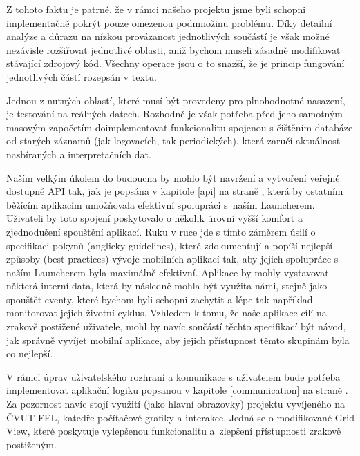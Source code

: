 \documentclass[thesis=M,czech]{FITthesis}[2012/06/26]
\begin{document}
Z tohoto faktu je patrné, že v rámci našeho projektu jsme byli schopni implementačně pokrýt pouze omezenou podmnožinu problému. Díky detailní analýze a důrazu na nízkou provázanost jednotlivých součástí je však možné nezávisle rozšiřovat jednotlivé oblasti, aniž bychom museli zásadně modifikovat stávající zdrojový kód. Všechny operace jsou o to snazší, že je princip fungování jednotlivých částí rozepsán v textu. 

Jednou z nutných oblastí, které musí být provedeny pro plnohodnotné nasazení, je testování na reálných datech. Rozhodně je však potřeba před jeho samotným masovým započetím doimplementovat funkcionalitu spojenou s čištěním databáze od starých záznamů (jak logovacích, tak periodických), která zaručí aktuálnost nasbíraných a interpretačních dat.

Naším velkým úkolem do budoucna by mohlo být navržení a vytvoření veřejně dostupné API tak, jak je popsána v kapitole \ref{api} na straně \pageref{api}, která by ostatním běžícím aplikacím umožňovala efektivní spolupráci s~naším Launcherem. Uživateli by toto spojení poskytovalo o několik úrovní vyšší komfort a zjednodušení spouštění aplikací. Ruku v ruce jde s tímto záměrem úsilí o specifikaci pokynů (anglicky guidelines), které zdokumentují a popíší nejlepší způsoby (best practices) vývoje mobilních aplikací tak, aby jejich spolupráce s naším Launcherem byla maximálně efektivní. Aplikace by mohly vystavovat některá interní data, která by následně mohla být využita námi, stejně jako spouštět eventy, které bychom byli schopni zachytit a lépe tak například monitorovat jejich životní cyklus. Vzhledem k tomu, že naše aplikace cílí na zrakově postižené uživatele, mohl by navíc součástí těchto specifikací být návod, jak správně vyvíjet mobilní aplikace, aby jejich přístupnost těmto skupinám byla co nejlepší.

V rámci úprav uživatelského rozhraní a komunikace s uživatelem bude potřeba implementovat aplikační logiku popsanou v kapitole \ref{communication} na straně \pageref{communication}. Za pozornost navíc stojí využití (jako hlavní obrazovky) projektu vyvíjeného na ČVUT FEL, katedře počítačové grafiky a interakce. Jedná se o modifikované Grid View\cite{grid_view}, které poskytuje vylepšenou funkcionalitu a~zlepšení přístupnosti zrakově postiženým.
\end{document}
